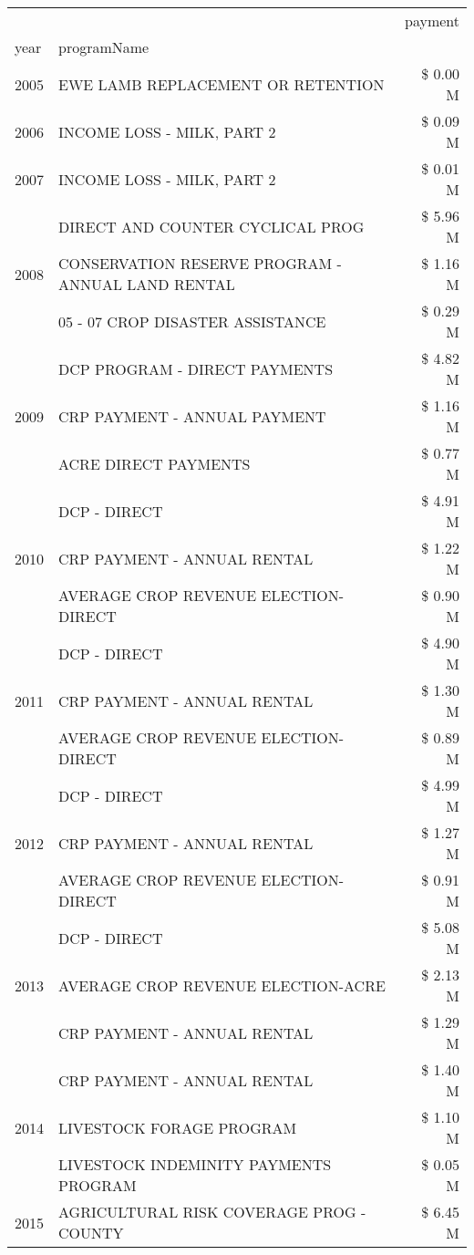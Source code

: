 \begin{tabular}{llr}
\toprule
 &  & payment \\
year & programName &  \\
\midrule
2005 & EWE LAMB REPLACEMENT OR RETENTION & \$ 0.00 M \\
\cline{1-3}
2006 & INCOME LOSS - MILK, PART 2 & \$ 0.09 M \\
\cline{1-3}
2007 & INCOME LOSS - MILK, PART 2 & \$ 0.01 M \\
\cline{1-3}
\multirow[t]{3}{*}{2008} & DIRECT AND COUNTER CYCLICAL PROG & \$ 5.96 M \\
 & CONSERVATION RESERVE PROGRAM - ANNUAL LAND RENTAL & \$ 1.16 M \\
 & 05 - 07 CROP DISASTER ASSISTANCE & \$ 0.29 M \\
\cline{1-3}
\multirow[t]{3}{*}{2009} & DCP PROGRAM - DIRECT PAYMENTS & \$ 4.82 M \\
 & CRP PAYMENT - ANNUAL PAYMENT & \$ 1.16 M \\
 & ACRE DIRECT PAYMENTS & \$ 0.77 M \\
\cline{1-3}
\multirow[t]{3}{*}{2010} & DCP - DIRECT & \$ 4.91 M \\
 & CRP PAYMENT - ANNUAL RENTAL & \$ 1.22 M \\
 & AVERAGE CROP REVENUE ELECTION-DIRECT & \$ 0.90 M \\
\cline{1-3}
\multirow[t]{3}{*}{2011} & DCP - DIRECT & \$ 4.90 M \\
 & CRP PAYMENT - ANNUAL RENTAL & \$ 1.30 M \\
 & AVERAGE CROP REVENUE ELECTION-DIRECT & \$ 0.89 M \\
\cline{1-3}
\multirow[t]{3}{*}{2012} & DCP - DIRECT & \$ 4.99 M \\
 & CRP PAYMENT - ANNUAL RENTAL & \$ 1.27 M \\
 & AVERAGE CROP REVENUE ELECTION-DIRECT & \$ 0.91 M \\
\cline{1-3}
\multirow[t]{3}{*}{2013} & DCP - DIRECT & \$ 5.08 M \\
 & AVERAGE CROP REVENUE ELECTION-ACRE & \$ 2.13 M \\
 & CRP PAYMENT - ANNUAL RENTAL & \$ 1.29 M \\
\cline{1-3}
\multirow[t]{3}{*}{2014} & CRP PAYMENT - ANNUAL RENTAL & \$ 1.40 M \\
 & LIVESTOCK FORAGE PROGRAM & \$ 1.10 M \\
 & LIVESTOCK INDEMINITY PAYMENTS PROGRAM & \$ 0.05 M \\
\cline{1-3}
\multirow[t]{3}{*}{2015} & AGRICULTURAL RISK COVERAGE PROG - COUNTY & \$ 6.45 M \\

\end{tabular}
